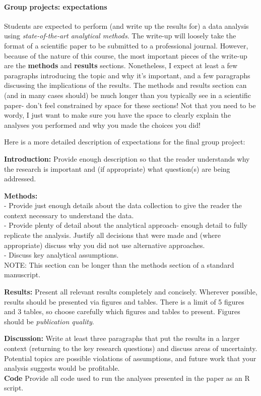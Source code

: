 \documentclass[]{article}
\let\oldparagraph\paragraph
\renewcommand{\paragraph}[1]{\oldparagraph{#1}\mbox{}}
\begin{document}
\paragraph{Group projects:
expectations}\label{group-projects-expectations}

Students are expected to perform (and write up the results for) a data
analysis using \emph{state-of-the-art analytical methods}. The write-up
will loosely take the format of a scientific paper to be submitted to a
professional journal. However, because of the nature of this course, the
most important pieces of the write-up are the \textbf{methods} and
\textbf{results} sections. Nonetheless, I expect at least a few
paragraphs introducing the topic and why it's important, and a few
paragraphs discussing the implications of the results. The methods and
results section can (and in many cases should) be much longer than you
typically see in a scientific paper- don't feel constrained by space for
these sections! Not that you need to be wordy, I just want to make sure
you have the space to clearly explain the analyses you performed and why
you made the choices you did!

Here is a more detailed description of expectations for the final group
project:

\textbf{Introduction:} Provide enough description so that the reader
understands why the research is important and (if appropriate) what
question(s) are being addressed.

\textbf{Methods:}\\
- Provide just enough details about the data collection to give the
reader the context necessary to understand the data.\\
- Provide plenty of detail about the analytical approach- enough detail
to fully replicate the analysis. Justify all decisions that were made
and (where appropriate) discuss why you did not use alternative
approaches.\\
- Discuss key analytical assumptions.\\
NOTE: This section can be longer than the methods section of a standard
manuscript.

\textbf{Results:} Present all relevant results completely and concisely.
Wherever possible, results should be presented via figures and tables.
There is a limit of 5 figures and 3 tables, so choose carefully which
figures and tables to present. Figures should be \emph{publication
quality}.

\textbf{Discussion:} Write at least three paragraphs that put the
results in a larger context (returning to the key research questions)
and discuss areas of uncertainty. Potential topics are possible
violations of assumptions, and future work that your analysis suggests
would be profitable.\\
\textbf{Code} Provide all code used to run the analyses presented in the
paper as an R script.
\end{document}
